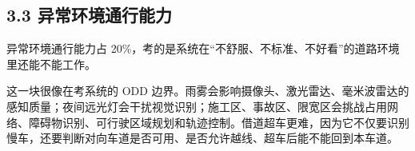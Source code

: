 \subsection{3.3 异常环境通行能力}

异常环境通行能力占 20\%，考的是系统在“不舒服、不标准、不好看”的道路环境里还能不能工作。

这一块很像在考系统的 ODD 边界。雨雾会影响摄像头、激光雷达、毫米波雷达的感知质量；夜间远光灯会干扰视觉识别；施工区、事故区、限宽区会挑战占用网络、障碍物识别、可行驶区域规划和轨迹控制。借道超车更难，因为它不仅要识别慢车，还要判断对向车道是否可用、是否允许越线、超车后能不能回到本车道。
